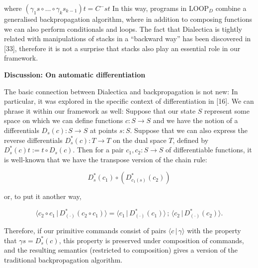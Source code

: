 where $(\gamma_{1}s\circ\ldots\circ\gamma_{k}s_{k-1})t=C^{-}st$ In this way, programs in $\mathrm{LOOP}_{D}$ combine a generalised backpropagation algorithm, where in addition to composing functions we can also perform conditionals and loops. The fact that Dialectica is tightly related with manipulations of stacks in a “backward way” has been discovered in [33], therefore it is not a surprise that stacks also play an essential role in our framework.\par
 
 
 
 
\par\medskip\noindent\textbf{Discussion: On automatic differentiation}\par
 
 
The basic connection between Dialectica and backpropagation is not new: In particular, it was explored in the specific context of differentiation in [16]. We can phrase it within our framework as well: Suppose that our state $S$ represent some space on which we can define functions $c:S\to S$ and we have the notion of a differentials $D_{s}({c}):S\to S$ at points $s:S$. Suppose that we can also express the reverse differentials $D^{\ast}_{s}({c}):T\to T$ on the dual space $T$, defined by $D^{\ast}_{s}({c})t:=t\circ D_{s}({c})$. Then for a pair $c_{1},c_{2}:S\to S$ of differentiable functions, it is well-known that we have the transpose version of the chain rule:\par
  
\par  \quad  \[D^{\ast}_{s}({c_{1}})\circ\left(D^{\ast}_{c_{1}(s)}({c_{2}})\right)\]\quad  \quad  
  
or, to put it another way,\par
  
\par  \quad  \[\langle{c_{2}\circ c_{1}}\,|\,{D^{\ast}_{(\cdot)}({c_{2}\circ c_{1}})}\rangle={\langle{c_{1}}\,|\,{D^{\ast}_{(\cdot)}({c_{1}})}\rangle}\,;\,{\langle{c_{2}}\,|\,{D^{\ast}_{(\cdot)}({c_{2}})}\rangle}.\]\quad  \quad  
  
Therefore, if our primitive commands consist of pairs $\langle{c}\,|\,{\gamma}\rangle$ with the property that $\gamma s=D^{\ast}_{s}({c})$, this property is preserved under composition of commands, and the resulting semantics (restricted to composition) gives a version of the traditional backpropagation algorithm.\par
 

